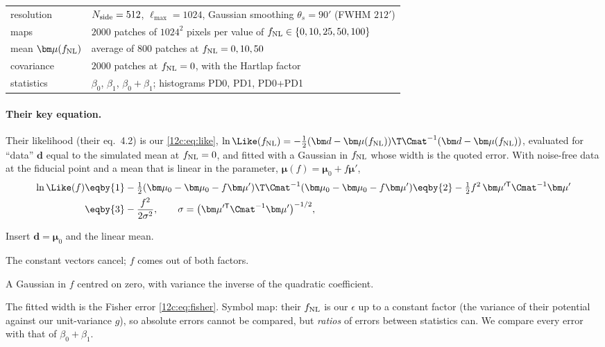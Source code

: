 \begin{center}
\small
\begin{tabular}{ll}
\toprule
resolution & $N_{\rm side}=512$, $\ell_{\max}=1024$, Gaussian smoothing $\theta_s=90'$ (FWHM $212'$)\\
maps & $2000$ patches of $1024^2$ pixels per value of $f_{\rm NL}\in\{0,10,25,50,100\}$\\
mean $\bm\mu(f_{\rm NL})$ & average of $800$ patches at $f_{\rm NL}=0,10,50$\\
covariance & $2000$ patches at $f_{\rm NL}=0$, with the Hartlap factor\\
statistics & $\beta_0$, $\beta_1$, $\beta_0+\beta_1$; histograms PD0, PD1, PD0+PD1\\
\bottomrule
\end{tabular}
\end{center}

\paragraph{Their key equation.} Their likelihood (their eq.~4.2) is our \eqref{12c:eq:like}, $\ln\Like(f_{\rm NL})=-\frac12(\bm d-\bm\mu(f_{\rm NL}))\T
\Cmat^{-1}(\bm d-\bm\mu(f_{\rm NL}))$, evaluated for ``data'' $\bm d$ equal to the simulated mean at $f_{\rm NL}=0$, and fitted with a Gaussian in
$f_{\rm NL}$ whose width is the quoted error. With noise-free data at the fiducial point and a mean that is linear in the parameter,
$\bm\mu(f)=\bm\mu_0+f\bm\mu'$,
\begin{align}
  \ln\Like(f)
  &\eqby{1}-\tfrac12(\bm\mu_0-\bm\mu_0-f\bm\mu')\T\Cmat^{-1}(\bm\mu_0-\bm\mu_0-f\bm\mu')
   \eqby{2}-\tfrac12f^2\,\bm\mu'^{\mathsf T}\Cmat^{-1}\bm\mu'\nonumber\\
  &\eqby{3}-\frac{f^2}{2\sigma^2},\qquad \sigma=\bigl(\bm\mu'^{\mathsf T}\Cmat^{-1}\bm\mu'\bigr)^{-1/2} ,
  \label{12c:eq:cs-like}
\end{align}
\begin{explain}
  \item Insert $\bm d=\bm\mu_0$ and the linear mean.
  \item The constant vectors cancel; $f$ comes out of both factors.
  \item A Gaussian in $f$ centred on zero, with variance the inverse of the quadratic coefficient.
\end{explain}
The fitted width is the Fisher error \eqref{12c:eq:fisher}. Symbol map: their $f_{\rm NL}$ is our $\epsilon$ up to a constant factor (the
variance of their potential against our unit-variance $g$), so absolute errors cannot be compared, but \emph{ratios} of errors between
statistics can. We compare every error with that of $\beta_0+\beta_1$.

